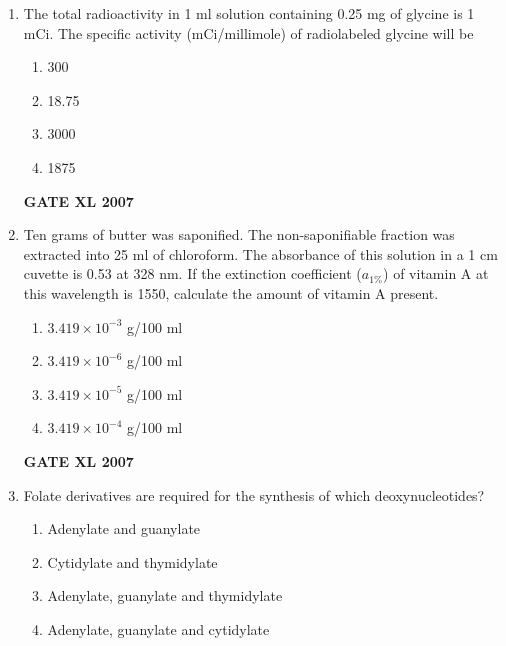 \documentclass[journal,12pt,onecolumn]{IEEEtran}
\begin{document}
\begin{enumerate}
    \item The total radioactivity in 1 ml solution containing 0.25 mg of glycine is 1 mCi. The specific activity (mCi/millimole) of radiolabeled glycine will be
    \begin{multicols}{4}
        \begin{enumerate} 
            \item 300
            \item 18.75
            \item 3000
            \item 1875
        \end{enumerate}
    \end{multicols}
	    \hfill \textbf{GATE XL 2007}

    \item Ten grams of butter was saponified. The non-saponifiable fraction was extracted into 25 ml of chloroform. The absorbance of this solution in a 1 cm cuvette is 0.53 at 328 nm. If the extinction coefficient ($a_{1\%}$) of vitamin A at this wavelength is 1550, calculate the amount of vitamin A present. 
    \begin{multicols}{2}
        \begin{enumerate} 
            \item $3.419 \times 10^{-3}$ g/100 ml
            \item $3.419 \times 10^{-6}$ g/100 ml
            \item $3.419 \times 10^{-5}$ g/100 ml
            \item $3.419 \times 10^{-4}$ g/100 ml
        \end{enumerate}
    \end{multicols}
    
	    \hfill \textbf{GATE XL 2007}
    \item Folate derivatives are required for the synthesis of which deoxynucleotides? 
    \begin{multicols}{2}
        \begin{enumerate} 
            \item Adenylate and guanylate
            \item Cytidylate and thymidylate
            \item Adenylate, guanylate and thymidylate
            \item Adenylate, guanylate and cytidylate
        \end{enumerate}
    \end{multicols}


\end{enumerate}
\end{document}
